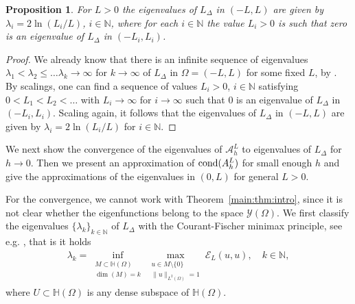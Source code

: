 \documentclass[11 pt]{article}
\newtheorem{proposition}[theorem]{Proposition}
\numberwithin{equation}{section}
\def\N{\mathbb{N}}
\def\mH{\mathbb{H}}
\begin{document}
\begin{proposition}\label{eigenvalue approximation a}
For $L>0$ the eigenvalues of $L_{\Delta}$ in $(-L,L)$ are given by $\lambda_i=2\ln(L_i/L)$, $i\in \N$, where for each $i\in \N$ the value $L_i>0$ is such that zero is an eigenvalue of $L_{\Delta}$ in $(-L_i,L_i)$.
\end{proposition}
\begin{proof}
We already know that there is an infinite sequence of eigenvalues $\lambda_1<\lambda_2\leq\ldots\lambda_k\to \infty$ for $k\to\infty$ of $L_{\Delta}$ in $\Omega=(-L,L)$ for some fixed $L$, by \cite[Theorem 1.4]{CW19}. By scalings, one can find a sequence of values $L_i>0$, $i\in \N$ satisfying $0<L_1<L_2<\ldots$ with $L_i\to\infty$ for $i\to \infty$ such that $0$ is an eigenvalue of $L_{\Delta}$ in $(-L_i,L_i)$. Scaling again, it follows that the eigenvalues of $L_{\Delta}$ in $(-L,L)$ are given by $\lambda_i=2\ln(L_i/L)$ for $i\in \N$.
%
\end{proof}

We next show the convergence of the eigenvalues of $\mathcal{A}^L_h$ to eigenvalues of $L_{\Delta}$ for $h\to 0$. Then we present an approximation of $\textnormal{cond}(A^L_h)$ for small enough $h$ and give the approximations of the eigenvalues in $(0,L)$ for general $L>0$.

For the convergence, we cannot work with Theorem~\ref{main:thm:intro}, since it is not clear whether the eigenfunctions belong to the space $\mathcal{Y} (\Omega)$. We first classify the eigenvalues $\{\lambda_k\}_{k\in \N}$ of $L_{\Delta}$ with the Courant-Fischer minimax principle, see e.g. \cite[Proposition 2.3 and Remark 2.4]{FJW22}, that is it holds
\begin{align}\label{CF}
\lambda_k=\inf_{\substack{M\subset \mH(\Omega)\\ \dim(M)=k}} \max_{\substack{u\in M\setminus\{0\}\\ \|u\|_{L^2(\Omega)}=1}} \mathcal{E}_L(u,u),\quad k\in \N, 
\end{align}
where $U\subset\mH(\Omega)$ is any dense subspace of $\mH(\Omega)$.
\end{document}
